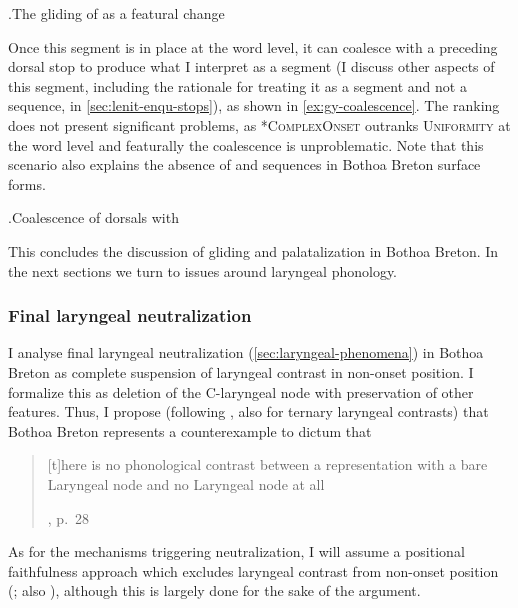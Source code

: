 \ex.\label{y-gliding-tableau}The gliding of \ipa{[y]} as a featural change\\

Once this segment is in place at the word level, it can coalesce with a preceding dorsal stop to produce what I interpret as a \ipa{[dʒɥ]} segment (I discuss other aspects of this segment, including the rationale for treating it as a segment and not a sequence, in \cref{sec:lenit-enqu-stops}), as shown in \ref{ex:gy-coalescence}. The ranking does not present significant problems, as *\textsc{ComplexOnset} outranks \textsc{Uniformity} at the word level and featurally the coalescence is unproblematic. Note that this scenario also explains the absence of \ipa{[ky]} and \ipa{[kɥ]} sequences in Bothoa Breton surface forms.

\ex.\label{ex:gy-coalescence}Coalescence of dorsals with \ipa{[ɥ]}\\


This concludes the discussion of gliding and palatalization in Bothoa Breton. In the next sections we turn to issues around laryngeal phonology.


\subsubsection{Final laryngeal neutralization}
\label{sec:final-laryng-neutr}

I analyse final laryngeal neutralization (\cref{sec:laryngeal-phenomena}) in Bothoa Breton as complete suspension of laryngeal contrast in non-onset position. I formalize this as deletion of the C-laryngeal node with preservation of other features. Thus, I propose (following \citealp{avery96:_repres_of_voicin_contr}, \cf also \citealp{hsu98:_voicin_taiwan,oostendorp08:_incom,strycharczuk12:_phonet} for ternary laryngeal contrasts) that Bothoa Breton represents a counterexample to  dictum that \blockquote[\citealp{lombardi95:_book}, p.~28]{[t]here is no phonological contrast between a representation with a bare Laryngeal node and no Laryngeal node at all}. As for the mechanisms triggering neutralization, I will assume a positional faithfulness approach which excludes laryngeal contrast from non-onset position (\citealp{beckman,lombardi99:_posit_faith_and_voicin_assim}; \cf also \citealp{bethin92:_polis}), although this is largely done for the sake of the argument.


